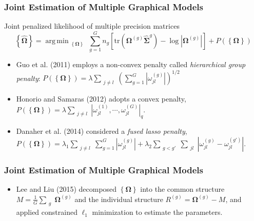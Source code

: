 \documentclass{beamer}
\newcommand{\bOmega}{{\boldsymbol{\Omega}}}
\newcommand{\bSigma}{{\boldsymbol{\Sigma}}}
\DeclareMathOperator*{\argmin}{arg\,min}
\begin{document}
\begin{frame}	
	\frametitle{Joint Estimation of Multiple Graphical Models}
	Joint penalized likelihood of multiple precision matrices  
	\begin{equation}
	\label{eq:multiplegraph}
	\left\{\hat{\bOmega} \right\} = \argmin_{\substack{\left\{\bOmega \right\}}} \sum_{g = 1}^{G} n_g \left[ \text{tr}(\bOmega^{(g)} \hat{\bSigma}^{{g}}) - \log|\bOmega^{(g)}| \right] + P(\left\{\bOmega \right\})
	\end{equation}
	\begin{itemize}[<+->]
		\item  Guo et al. (2011) employs a non-convex penalty called \emph{hierarchical group penalty}: $P(\left\{\bOmega \right\}) = \lambda \sum_{\substack{j \neq l}}\left(\sum_{g = 1}^{G} |\omega_{jl}^{(g)}| \right)^{1/2}$
		\item Honorio and Samaras (2012) adopts a convex penalty, $P(\left\{\bOmega \right\}) = \lambda \sum_{\substack{j \neq l}} |\omega_{jl}^{(1)}, \cdots, \omega_{jl}^{(G)}|_q$.
		\item Danaher et al. (2014) considered a \emph{fused lasso penalty}, $P(\left\{\bOmega \right\}) = \lambda_1 \sum_{\substack{j \neq l}}\sum_{g = 1}^{G}|\omega_{jl}^{(g)}| + \lambda_2 \sum_{\substack{g < g'}}\sum_{\substack{jl}}|\omega_{jl}^{(g)} - \omega_{jl}^{(g')}|$.
	\end{itemize}
\end{frame}	


\begin{frame}	
	\frametitle{Joint Estimation of Multiple Graphical Models}
	\begin{itemize}[<+->]
		\item Lee and Liu (2015) decomposed $\left\{\bOmega \right\}$ into the common structure $M = \frac{1}{G} \sum_{\substack{g}} \bOmega^{(g)}$ and the individual structure $R^{(g)} = \bOmega^{(g)} - M$, and applied constrained $\ell_1$ minimization to estimate the parameters.       
	\end{itemize}
\end{frame}	

\end{document}
